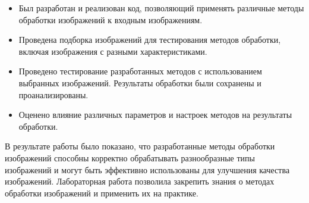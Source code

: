 \documentclass{article}
\begin{document}
    \begin{itemize}
        \item Был разработан и реализован код, позволяющий применять различные методы обработки изображений к входным изображениям.

        \item Проведена подборка изображений для тестирования методов обработки, включая изображения с разными характеристиками.

        \item Проведено тестирование разработанных методов с использованием выбранных изображений. Результаты обработки были сохранены и проанализированы.

        \item Оценено влияние различных параметров и настроек методов на результаты обработки.

    \end{itemize}

    В результате работы было показано, что разработанные методы обработки изображений способны корректно обрабатывать разнообразные типы изображений и могут быть эффективно использованы для улучшения качества изображений. Лабораторная работа позволила закрепить знания о методах обработки изображений и применить их на практике.
\end{document}
